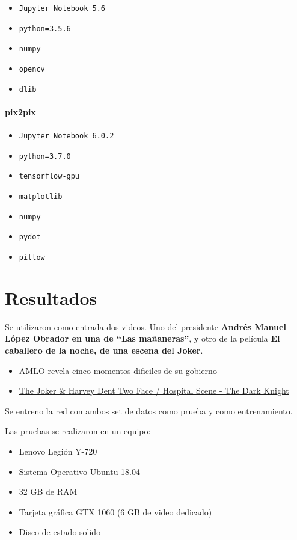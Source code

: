 \documentclass[10pt,journal,compsoc]{IEEEtran}\usepackage[T1]{fontenc}                              %
\begin{document}
\begin{itemize}
\item
  \texttt{Jupyter\ Notebook\ 5.6}
\item
  \texttt{python=3.5.6}
\item
  \texttt{numpy}
\item
  \texttt{opencv}
\item
  \texttt{dlib}
\end{itemize}

\paragraph{pix2pix}

\begin{itemize}
\item
  \texttt{Jupyter\ Notebook\ 6.0.2}
\item
  \texttt{python=3.7.0}
\item
  \texttt{tensorflow-gpu}
\item
  \texttt{matplotlib}
\item
  \texttt{numpy}
\item
  \texttt{pydot}
\item
  \texttt{pillow}
\end{itemize}


\section{Resultados}

Se utilizaron como entrada dos videos. Uno del presidente \textbf{Andrés
Manuel López Obrador en una de ``Las mañaneras''}, y otro de la película
\textbf{El caballero de la noche, de una escena del Joker}.

\begin{itemize}
\item
  \href{https://www.youtube.com/watch?v=BSc32rRlZdM}{AMLO revela cinco
  momentos dificiles de su gobierno}
\item
  \href{https://www.youtube.com/watch?v=YEEsE8snXok}{The Joker \& Harvey
  Dent Two Face / Hospital Scene - The Dark Knight}
\end{itemize}

Se entreno la red con ambos set de datos como prueba y como
entrenamiento.

Las pruebas se realizaron en un equipo:

\begin{itemize}
\item
  Lenovo Legión Y-720
\item
  Sistema Operativo Ubuntu 18.04
\item
  32 GB de RAM
\item
  Tarjeta gráfica GTX 1060 (6 GB de video dedicado)
\item
  Disco de estado solido
\end{itemize}
\end{document}
